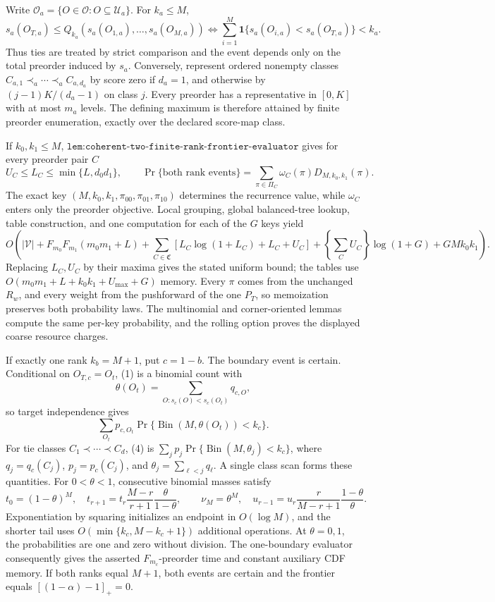Write \(\mathcal O_a=\{O\in\mathcal O:O\subseteq\mathcal U_a\}\). For \(k_a\le M\),
\[
s_a(O_{T,a})\le Q_{k_a}(s_a(O_{1,a}),\ldots,s_a(O_{M,a}))\iff\sum_{i=1}^M\mathbf1\{s_a(O_{i,a})<s_a(O_{T,a})\}<k_a.
\tag{1}
\]
Thus ties are treated by strict comparison and the event depends only on the total preorder induced by \(s_a\). Conversely, represent ordered nonempty classes \(C_{a,1}\prec_a\cdots\prec_a C_{a,d_a}\) by score zero if \(d_a=1\), and otherwise by \((j-1)K/(d_a-1)\) on class \(j\). Every preorder has a representative in \([0,K]\) with at most \(m_a\) levels. The defining maximum is therefore attained by finite preorder enumeration, exactly over the declared score-map class.

If \(k_0,k_1\le M\), \(\texttt{lem:coherent-two-finite-rank-frontier-evaluator}\) gives for every preorder pair \(C\)
\[
U_C\le L_C\le\min\{L,d_0d_1\},\qquad \Pr\{\text{both rank events}\}=\sum_{\pi\in\Pi_C}\omega_C(\pi)D_{M,k_0,k_1}(\pi).
\tag{2}
\]
The exact key \((M,k_0,k_1,\pi_{00},\pi_{01},\pi_{10})\) determines the recurrence value, while \(\omega_C\) enters only the preorder objective. Local grouping, global balanced-tree lookup, table construction, and one computation for each of the \(G\) keys yield
\[
O\!\left(|\mathcal V|+F_{m_0}F_{m_1}(m_0m_1+L)+\sum_{C\in\mathfrak C}[L_C\log(1+L_C)+L_C+U_C]+\left\{\sum_CU_C\right\}\log(1+G)+GMk_0k_1\right).
\tag{3}
\]
Replacing \(L_C,U_C\) by their maxima gives the stated uniform bound; the tables use \(O(m_0m_1+L+k_0k_1+U_{\max}+G)\) memory. Every \(\pi\) comes from the unchanged \(R_w\), and every weight from the pushforward of the one \(P_T\), so memoization preserves both probability laws. The multinomial and corner-oriented lemmas compute the same per-key probability, and the rolling option proves the displayed coarse resource charges.

If exactly one rank \(k_b=M+1\), put \(c=1-b\). The boundary event is certain. Conditional on \(O_{T,c}=O_t\), (1) is a binomial count with
\[
\theta(O_t)=\sum_{O:s_c(O)<s_c(O_t)}q_{c,O},
\]
so target independence gives
\[
\sum_{O_t}p_{c,O_t}\Pr\{\operatorname{Bin}(M,\theta(O_t))<k_c\}.
\tag{4}
\]
For tie classes \(C_1\prec\cdots\prec C_d\), (4) is \(\sum_jp_j\Pr\{\operatorname{Bin}(M,\theta_j)<k_c\}\), where \(q_j=q_c(C_j)\), \(p_j=p_c(C_j)\), and \(\theta_j=\sum_{\ell<j}q_\ell\). A single class scan forms these quantities. For \(0<\theta<1\), consecutive binomial masses satisfy
\[
t_0=(1-\theta)^M,\quad t_{r+1}=t_r\frac{M-r}{r+1}\frac{\theta}{1-\theta},
\qquad\nu_M=\theta^M,\quad u_{r-1}=u_r\frac r{M-r+1}\frac{1-\theta}{\theta}.
\tag{5}
\]
Exponentiation by squaring initializes an endpoint in \(O(\log M)\), and the shorter tail uses \(O(\min\{k_c,M-k_c+1\})\) additional operations. At \(\theta=0,1\), the probabilities are one and zero without division. The one-boundary evaluator consequently gives the asserted \(F_{m_c}\)-preorder time and constant auxiliary CDF memory. If both ranks equal \(M+1\), both events are certain and the frontier equals \([(1-\alpha)-1]_+=0\).

